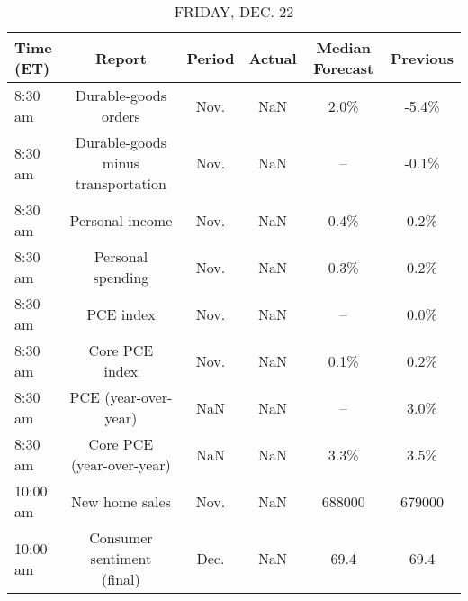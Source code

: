 \documentclass{article}%
\begin{document}
\begin{table}[htbp]%
\caption{FRIDAY, DEC. 22}%
\centering%
\begin{adjustbox}{width=1\textwidth}%
\begin{tabular}{lccccc}
\toprule
Time (ET) &                             Report & Period & Actual & Median Forecast & Previous \\
\midrule
  8:30 am &               Durable-goods orders &   Nov. &    NaN &            2.0\% &    -5.4\% \\
  8:30 am & Durable-goods minus transportation &   Nov. &    NaN &              -- &    -0.1\% \\
  8:30 am &                    Personal income &   Nov. &    NaN &            0.4\% &     0.2\% \\
  8:30 am &                  Personal spending &   Nov. &    NaN &            0.3\% &     0.2\% \\
  8:30 am &                          PCE index &   Nov. &    NaN &              -- &     0.0\% \\
  8:30 am &                     Core PCE index &   Nov. &    NaN &            0.1\% &     0.2\% \\
  8:30 am &               PCE (year-over-year) &    NaN &    NaN &              -- &     3.0\% \\
  8:30 am &          Core PCE (year-over-year) &    NaN &    NaN &            3.3\% &     3.5\% \\
 10:00 am &                     New home sales &   Nov. &    NaN &          688000 &   679000 \\
 10:00 am &         Consumer sentiment (final) &   Dec. &    NaN &            69.4 &     69.4 \\
\bottomrule
\end{tabular}
%
\end{adjustbox}%
\end{table}
\end{document}
